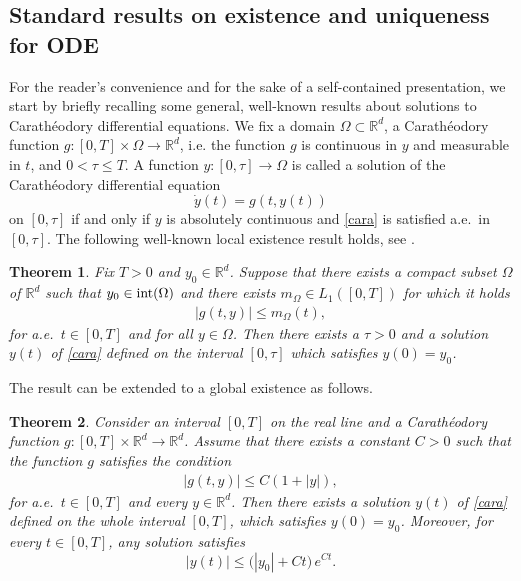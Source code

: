 \documentclass[A4paper,11pt]{article}
\newtheorem{theorem}{Theorem}[section]
\theoremstyle{definition}
\newcommand{\R}{\mathbb{R}}
\begin{document}
\subsection{Standard results on existence and uniqueness for ODE}\label{ap00}

For the reader's convenience and for the sake of a self-contained presentation, we start by briefly recalling some general, well-known results about solutions to Carath{\'e}odory differential equations. We fix a domain $\Omega \subset \R^d$, a Carath{\'e}odory function $g\colon[0,T]\times \Omega \to \R^d$, i.e. the function $g$ is continuous in $y$ and measurable in $t$, and $0<\tau \le T$. A function $y\colon [0,\tau]\to \Omega$ is called a solution of the Carath{\'e}odory differential equation
\begin{equation}\label{cara}
\dot y(t)=g(t, y(t))
\end{equation}
on $[0,\tau]$ if and only if $y$ is absolutely continuous and \eqref{cara} is satisfied a.e.\ in $[0,\tau]$.
The following well-known local existence result holds, see \cite[Chapter 1, Theorem 1]{Fil} .


\begin{theorem}\label{cara-local}
Fix $T > 0$ and $y_0 \in \R^d$. Suppose that there exists a compact subset $\Omega$ of $\R^d$ such that $y_0 \in \textup{int}(\Omega)$ and there exists $m_{\Omega} \in L_1([0,T])$ for which it holds
\begin{align}\label{l1}
|g(t,y)|\le m_{\Omega}(t),
\end{align}
for a.e.\ $t \in [0,T]$ and for all $y \in \Omega$. Then there exists a $\tau > 0$ and a solution $y(t)$ of \eqref{cara} defined on the interval $[0,\tau]$ which satisfies $y(0)=y_0$. 
\end{theorem}

The result can be extended to a global existence as follows.

\begin{theorem}\label{cara-global}
Consider an interval $[0,T]$  on the real line and a  Carath{\'e}odory function $g\colon[0,T]\times \R^d \to \R^d$.
Assume that there exists a constant $C > 0$ such that the function $g$ satisfies the condition
\begin{align}\label{ttz}
|g(t,y)|\le C(1+|y|),
\end{align}
for a.e.\ $t \in [0,T]$ and every $y \in \mathbb R^d$. Then there exists a solution $y(t)$ of \eqref{cara} defined on the whole interval $[0,T]$, which satisfies $y(0)=y_0$. Moreover, for every $t \in [0,T]$, any solution satisfies
\begin{equation}\label{gron}
|y(t)|\le \Big(|y_0|+ Ct\Big) \,e^{Ct}.
\end{equation}
\end{theorem}
\end{document}
